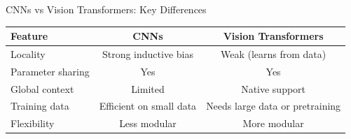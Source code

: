 \begin{frame}{CNNs vs Vision Transformers: Key Differences}
\begin{table}[]
\centering
\begin{tabular}{|l|c|c|}
\hline
\textbf{Feature} & \textbf{CNNs} & \textbf{Vision Transformers} \\
\hline
Locality & Strong inductive bias & Weak (learns from data) \\
Parameter sharing & Yes & Yes \\
Global context & Limited & Native support \\
Training data & Efficient on small data & Needs large data or pretraining \\
Flexibility & Less modular & More modular \\
\hline
\end{tabular}
\end{table}
\end{frame}